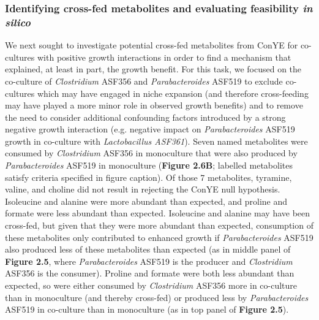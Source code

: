 \documentclass[11pt,onecolumn,notitlepage,openany,twoside]{book}
\begin{document}
\begin{refsection}
\subsubsection{Identifying cross-fed metabolites and evaluating feasibility \textit{in silico}}

We next sought to investigate potential cross-fed metabolites from ConYE for co-cultures with positive growth interactions in order to find a mechanism that explained, at least in part, the growth benefit. For this task, we focused on the co-culture of \textit{Clostridium} ASF356 and \textit{Parabacteroides} ASF519 to exclude co-cultures which may have engaged in niche expansion (and therefore cross-feeding may have played a more minor role in observed growth benefits) and to remove the need to consider additional confounding factors introduced by a strong negative growth interaction (e.g. negative impact on \textit{Parabacteroides} ASF519 growth in co-culture with \textit{Lactobacillus ASF361}). Seven named metabolites were consumed by \textit{Clostridium} ASF356 in monoculture that were also produced by \textit{Parabacteroides} ASF519 in monoculture (\textbf{Figure 2.6B}; labelled metabolites satisfy criteria specified in figure caption). Of those 7 metabolites, tyramine, valine, and choline did not result in rejecting the ConYE null hypothesis. Isoleucine and alanine were more abundant than expected, and proline and formate were less abundant than expected. Isoleucine and alanine may have been cross-fed, but given that they were more abundant than expected, consumption of these metabolites only contributed to enhanced growth if \textit{Parabacteroides} ASF519 also produced less of these metabolites than expected (as in middle panel of \textbf{Figure 2.5}, where \textit{Parabacteroides} ASF519 is the producer and \textit{Clostridium} ASF356 is the consumer). Proline and formate were both less abundant than expected, so were either consumed by \textit{Clostridium} ASF356 more in co-culture than in monoculture (and thereby cross-fed) or produced less by \textit{Parabacteroides} ASF519 in co-culture than in monoculture (as in top panel of \textbf{Figure 2.5}).


\end{refsection}
\end{document}
